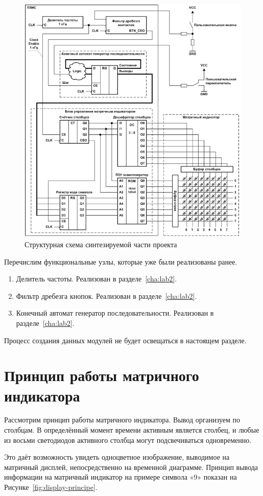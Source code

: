\begin{figure}[h!]
	\centering
	\includegraphics[width=0.6\linewidth]{course-plis/images/lab4/struct-scheme}
	\caption{Структурная схема синтезируемой части проекта}
	\label{fig:struct-scheme}
\end{figure}


Перечислим функциональные узлы, которые уже были реализованы ранее. 

\begin{enumerate}
	\item Делитель частоты. Реализован в разделе~\ref{cha:lab2}.
	\item Фильтр дребезга кнопок. Реализован в разделе~\ref{cha:lab2}.
	\item Конечный автомат генератор последовательности. Реализован в разделе~\ref{cha:lab2}.
\end{enumerate}

Процесс создания данных модулей не будет освещаться в настоящем разделе. 

\section{Принцип работы матричного индикатора}
Рассмотрим принцип работы матричного индикатора.
Вывод организуем по столбцам. В определённый момент времени активным является столбец,
и любые из восьми светодиодов активного столбца могут подсвечиваться
одновременно. 

Это даёт возможность увидеть одноцветное изображение,
выводимое на матричный дисплей, непосредственно на временной
диаграмме. Принцип вывода информации на матричный индикатор на
примере символа «9» показан на Рисунке~\ref{fig:display-principe}.

